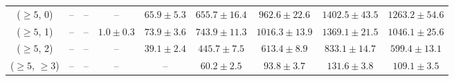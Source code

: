 \begin{table}[h!]
{\begin{tabular}{ccccccccc}
	($\ge5$, 0) & -- & -- & -- & $65.9\pm 5.3$ & $655.7\pm 16.4$ & $962.6\pm 22.6$ & $1402.5\pm 43.5$ & $1263.2\pm 54.6$ \\[0.5ex] 
	($\ge5$, 1) & -- & -- & $1.0\pm 0.3$ & $73.9\pm 3.6$ & $743.9\pm 11.3$ & $1016.3\pm 13.9$ & $1369.1\pm 21.5$ & $1046.1\pm 25.6$ \\[0.5ex] 
	($\ge5$, 2) & -- & -- & -- & $39.1\pm 2.4$ & $445.7\pm 7.5$ & $613.4\pm 8.9$ & $833.1\pm 14.7$ & $599.4\pm 13.1$ \\[0.5ex] 
	($\ge5$, $\ge3$) & -- & -- & -- & -- & $60.2\pm 2.5$ & $93.8\pm 3.7$ & $131.6\pm 3.8$ & $109.1\pm 3.5$ \\[0.5ex] 
	\hline
	\hline
\end{tabular}}
\end{table}
